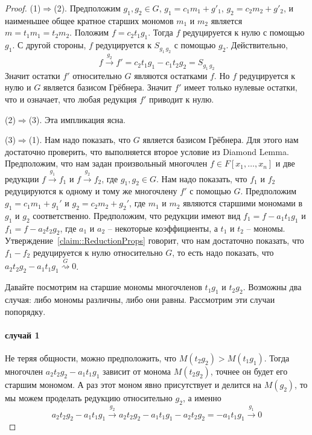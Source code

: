 \begin{proof}
(1)$\Rightarrow$(2).
Предположим $g_1,g_2\in G$, $g_1 = c_1 m_1 + g'_1$, $g_2 = c_2m_2 + g'_2$, и наименьшее общее кратное старших мономов $m_1$ и $m_2$ является $m = t_1 m_1 = t_2 m_2$.
Положим $f = c_2 t_1 g_1$.
Тогда $f$ редуцируется к нулю с помощью $g_1$.
С другой стороны, $f$ редуцируется к  $S_{g_1\,g_2}$ с помощью $g_2$.
Действительно,
\[
f\stackrel{g_2}{\longrightarrow} f' = c_2 t_1 g_1 - c_1 t_2 g_2 = S_{g_1\,g_2}
\]
Значит остатки $f'$ относительно $G$ являются остатками $f$.
Но $f$ редуцируется к нулю и $G$ является базисом Грёбнера.
Значит $f'$ имеет только нулевые остатки, что и означает, что любая редукция $f'$ приводит к нулю.

(2)$\Rightarrow$(3).
Эта импликация ясна.

(3)$\Rightarrow$(1).
Нам надо показать, что $G$ является базисом Грёбнера.
Для этого нам достаточно проверить, что выполняется второе условие из Diamond Lemma.
Предположим, что нам задан произвольный многочлен $f\in F[x_1,\ldots,x_n]$ и две редукции $f \stackrel{g_1}{\longrightarrow}f_1$ и $f\stackrel{g_2}{\longrightarrow}f_2$, где $g_1,g_2\in G$.
Нам надо показать, что $f_1$ и $f_2$ редуцируются к одному и тому же многочлену $f'$ с помощью $G$.
Предположим $g_1 = c_1 m_1 + g_1'$ и $g_2 = c_2 m_2 + g_2'$, где $m_1$ и $m_2$ являются старшими мономами в $g_1$ и $g_2$ соответственно.
Предположим, что редукции имеют вид $f_1 = f - a_1 t_1 g_1$ и $f_1 = f - a_2 t_2 g_2$, где $a_1$ и $a_2$ -- некоторые коэффициенты, а $t_1$ и $t_2$ -- мономы.
Утверждение~\ref{claim::ReductionProps} говорит, что нам достаточно показать, что $f_1 - f_2$ редуцируется к нулю относительно $G$, то есть надо показать, что $a_2t_2g_2 - a_1 t_1 g_1 \stackrel{G}{\rightsquigarrow}0$.

Давайте посмотрим на старшие мономы многочленов $t_1g_1$ и $t_2 g_2$.
Возможны два случая: либо мономы различны, либо они равны.
Рассмотрим эти случаи попорядку.

\paragraph{случай 1}

Не теряя общности, можно предположить, что $M(t_2 g_2) > M(t_1 g_1)$.
Тогда многочлен $a_2t_2g_2 - a_1 t_1 g_1$ зависит от монома $M(t_2 g_2)$, точнее он будет его старшим мономом.
А раз этот моном явно присутствует и делится на $M(g_2)$, то мы можем проделать редукцию относительно $g_2$, а именно
\[
a_2t_2g_2 - a_1 t_1 g_1\stackrel{g_2}{\longrightarrow} a_2t_2g_2 - a_1 t_1 g_1 - a_2t_2 g_2 = - a_1 t_1 g_1 \stackrel{g_1}{\longrightarrow} 0
\]


\end{proof}
